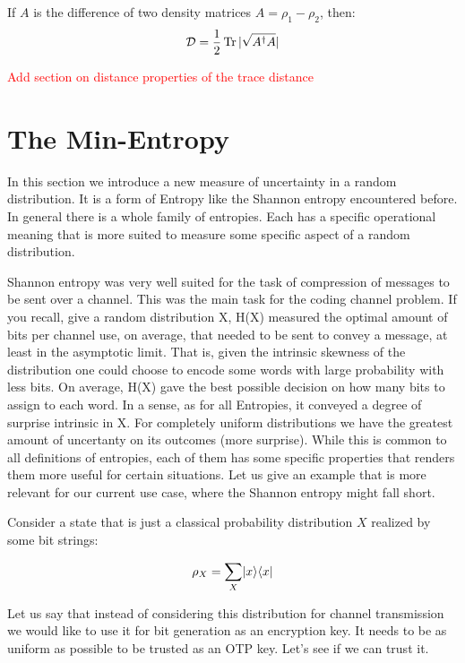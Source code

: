 \begin{theorem}
	If $A$ is the difference of two density matrices $A = \rho_1 - \rho_2$, then:
	\begin{equation}
		\mathcal{D} = \frac{1}{2} \operatorname{Tr} |\sqrt{A^{\dagger}A}|
	\end{equation}
\end{theorem}

\textcolor{red}{Add section on distance properties of the trace distance}


\section{The Min-Entropy}

In this section we introduce a new measure of uncertainty in a random distribution. It is a form of Entropy like the Shannon entropy encountered before.
In general there is a whole family of entropies. Each has a specific operational meaning that is more suited to measure some specific aspect of a random distribution.

Shannon entropy was very well suited for the task of compression of messages to be sent over a channel. This was the main task for the coding channel problem. If you recall, give a random distribution X,  H(X) measured the optimal amount of bits per channel use, on average, that needed to be sent to convey a message, at least in the asymptotic limit. That is, given the intrinsic skewness of the distribution one could choose to encode some words with large probability with less bits. On average, H(X) gave the best possible decision on how many bits to assign to each word. In a sense, as for all Entropies, it conveyed a degree of surprise intrinsic in X. For completely uniform distributions we have the greatest amount of uncertanty on its outcomes (more surprise). While this is common to all definitions of entropies, each of them has some specific properties that renders them more useful for certain situations. Let us give an example that is more relevant for our current use case, where the Shannon entropy might fall short.

Consider a state that is just a classical probability distribution $X$ realized by some bit strings:

\begin{equation}
	\rho_X = \sum_X \lvert x\rangle \langle x\rvert
\end{equation}

Let us say that instead of considering this distribution for channel transmission we would like to use it for bit generation as an encryption key. It needs to be as uniform as possible to be trusted as an OTP key. Let's see if we can trust it.


